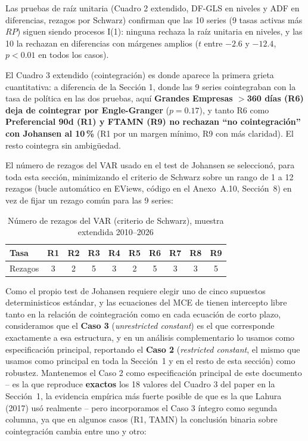 \documentclass[12pt, letterpaper]{article}
\begin{document}
Las pruebas de raíz unitaria (Cuadro 2 extendido, DF-GLS en niveles y
ADF en diferencias, rezagos por Schwarz) confirman que las 10 series
(9 tasas activas más $RP$) siguen siendo procesos I(1): ninguna
rechaza la raíz unitaria en niveles, y las 10 la rechazan en
diferencias con márgenes amplios ($t$ entre $-2.6$ y $-12.4$,
$p<0.01$ en todos los casos).

El Cuadro 3 extendido (cointegración) es donde aparece la primera
grieta cuantitativa: a diferencia de la Sección 1, donde las 9 series
cointegraban con la tasa de política en las dos pruebas, aquí
\textbf{Grandes Empresas $>$360 días (R6) deja de cointegrar por
Engle-Granger} ($p=0.17$), y tanto R6 como \textbf{Preferencial 90d
(R1) y FTAMN (R9) no rechazan ``no cointegración'' con Johansen al
10\,\%} (R1 por un margen mínimo, R9 con más claridad). El resto
cointegra sin ambigüedad.

El número de rezagos del VAR usado en el test de Johansen se
seleccionó, para toda esta sección, minimizando el criterio de
Schwarz sobre un rango de 1 a 12 rezagos (bucle automático en EViews,
código en el Anexo~A.10, Sección~8) en vez de fijar un rezago común
para las 9 series:

\begin{table}[ht]
\renewcommand{\thetable}{9}
\caption{Número de rezagos del VAR (criterio de Schwarz), muestra
         extendida 2010--2026}
\label{tab:rezagosext}
\centering
\small
\begin{tabular}{lccccccccc}
\toprule
Tasa & R1 & R2 & R3 & R4 & R5 & R6 & R7 & R8 & R9 \\
\midrule
Rezagos & 3 & 2 & 5 & 3 & 2 & 5 & 3 & 3 & 5 \\
\bottomrule
\end{tabular}
\end{table}

Como el propio test de Johansen requiere elegir uno de cinco supuestos
deterministicos estándar, y las ecuaciones del MCE de \textcite{lahura2017}
tienen intercepto libre tanto en la relación de cointegración como en
cada ecuación de corto plazo, consideramos que el \textbf{Caso 3}
(\textit{unrestricted constant}) es el que corresponde exactamente a
esa estructura, y en un análisis complementario lo usamos como
especificación principal, reportando el \textbf{Caso 2} (\textit{restricted
constant}, el mismo que usamos como principal en toda la Sección~1 y
en el resto de esta sección) como robustez. Mantenemos el Caso 2 como
especificación principal de este documento -- es la que reproduce
\textbf{exactos} los 18 valores del Cuadro 3 del paper en la
Sección~1, la evidencia empírica más fuerte posible de que es la que
Lahura (2017) usó realmente -- pero incorporamos el Caso 3 íntegro
como segunda columna, ya que en algunos casos (R1, TAMN) la conclusión
binaria sobre cointegración cambia entre uno y otro:
\end{document}
